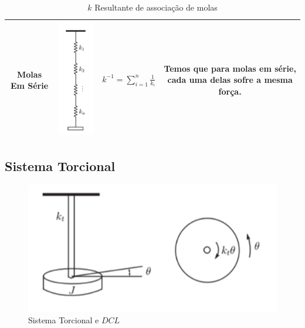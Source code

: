 \documentclass{article}
\begin{document}
\begin{table}[h]
\begin{tabular}{|c|c|c|c|}
                        Molas Em Série &
                        \begin{minipage}{.3\linewidth}
                            \centering
                            \includegraphics[width=.2\linewidth]{imgs/mola_eq_6.png}
                        \end{minipage}
                        &
                        $k^{-1} = \sum_{i = 1}^n \frac{1}{k_i}$
                        &
                        \begin{minipage}{0.3\columnwidth}
                        Temos que para molas em série, cada uma delas sofre a mesma força. 
                        \end{minipage}\\ \hline
                    \end{tabular}
                    \caption{$k$ Resultante de associação de molas}
                \end{table}

                    
            \subsection{Sistema Torcional}

                \begin{figure}[h]
                    \centering
                    \includegraphics[width=.5\textwidth]{imgs/sis_torcional.png}
                    \caption{Sistema Torcional e $DCL$}
                \end{figure}
\end{document}
